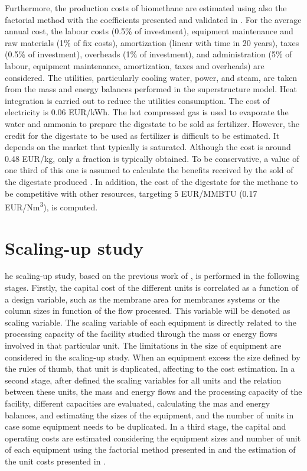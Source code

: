 \begin{refsection}[referencesCh7]
Furthermore, the production costs of biomethane are estimated using also the factorial method with the coefficients presented and validated in \citet{davis2014optimala}. For the average annual cost, the labour costs (0.5\% of investment), equipment maintenance and raw materials (1\% of fix costs), amortization (linear with time in 20 years), taxes (0.5\% of investment), overheads (1\% of investment), and administration (5\% of labour, equipment maintenance, amortization, taxes and overheads) are considered. The utilities, particularly cooling water, power, and steam, are taken from the mass and energy balances performed in the superstructure model. Heat integration is carried out to reduce the utilities consumption. The cost of electricity is 0.06 EUR/kWh. The hot compressed gas is used to evaporate the water and ammonia to prepare the digestate to be sold as fertilizer. However, the credit for the digestate to be used as fertilizer is difficult to be estimated. It depends on the market that typically is saturated. Although the cost is around 0.48 EUR/kg, only a fraction is typically obtained. To be conservative, a value of one third of this one is assumed to calculate the benefits received by the sold of the digestate produced \citep{leon2016optimal}. In addition, the cost of the digestate for the methane to be competitive with other resources, targeting 5 EUR/MMBTU (0.17 EUR/Nm\textsuperscript{3}), is computed. 

\section{Scaling-up study} \label{section:SuppMatPaperCO2Section4}
he scaling-up study, based on the previous work of \citet{sanchez2018scale}, is performed in the following stages. Firstly, the capital cost of the different units is correlated as a function of a design variable, such as the membrane area for membranes systems or the column sizes in function of the flow processed. This variable will be denoted as scaling variable. The scaling variable of each equipment is directly related to the processing capacity of the facility studied through the mass or energy flows involved in that particular unit. The limitations in the size of equipment are considered in the scaling-up study. When an equipment excess the size defined by the rules of thumb, that unit is duplicated, affecting to the cost estimation. In a second stage, after defined the scaling variables for all units and the relation between these units, the mass and energy flows and the processing capacity of the facility, different capacities are evaluated, calculating the mas and energy balances, and estimating the sizes of the equipment, and the number of units in case some equipment needs to be duplicated. In a third stage, the capital and operating costs are estimated considering the equipment sizes and number of unit of each equipment using the factorial method presented in \citet{towler2009chemical} and the estimation of the unit costs presented in \citet{almena2016technoeconomic}.


\end{refsection}
